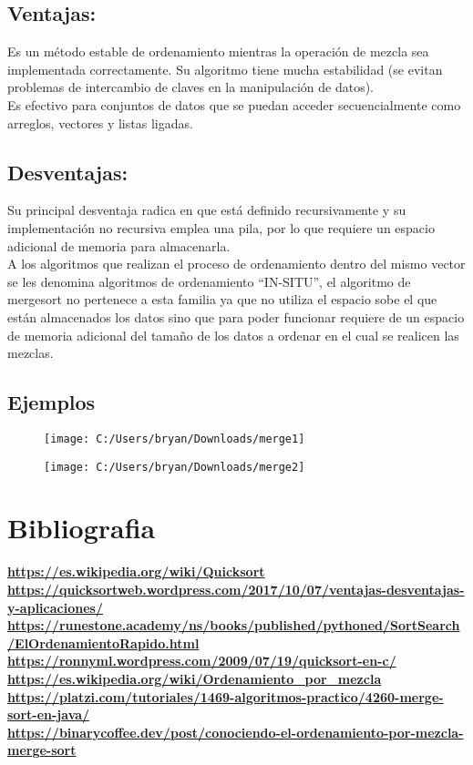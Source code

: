 \documentclass[]{article}
\begin{document}
\subsection{Ventajas:}
Es un método estable de ordenamiento mientras la operación de mezcla sea implementada correctamente.
Su algoritmo tiene mucha estabilidad (se evitan problemas de intercambio de claves en la manipulación de datos).\\
Es efectivo para conjuntos de datos que se puedan acceder secuencialmente como arreglos, vectores y listas ligadas.\\

\subsection{Desventajas:}
Su principal desventaja radica en que está definido recursivamente y su implementación no recursiva emplea una pila, por lo que requiere un espacio adicional de memoria para almacenarla.\\
A los algoritmos que realizan el proceso de ordenamiento dentro del mismo vector se les denomina algoritmos de ordenamiento “IN-SITU”, el algoritmo de mergesort no pertenece a esta familia ya que no utiliza el espacio sobe el que están almacenados los datos sino que para poder funcionar requiere de un espacio de memoria adicional del tamaño de los datos a ordenar en el cual se realicen las mezclas.\\
\newpage
\subsection{Ejemplos}
\begin{figure}[h!]
	\centering
	\texttt{[image: C:/Users/bryan/Downloads/merge1]}
	\caption{}
	\label{fig:merge1}
\end{figure}
\begin{figure}[t!]
	\centering
	\texttt{[image: C:/Users/bryan/Downloads/merge2]}
	\caption{}
	\label{fig:merge2}
\end{figure}
\newpage
\section{Bibliografia}

\underline{\textbf{https://es.wikipedia.org/wiki/Quicksort}}\\
\underline{\textbf{https://quicksortweb.wordpress.com/2017/10/07/ventajas-desventajas-y-aplicaciones/}}\\
\underline{\textbf{https://runestone.academy/ns/books/published/pythoned/SortSearch/ElOrdenamientoRapido.html}}\\
\underline{\textbf{https://ronnyml.wordpress.com/2009/07/19/quicksort-en-c/}}\\
\underline{\textbf{https://es.wikipedia.org/wiki/Ordenamiento\_por\_mezcla}}\\
\underline{\textbf{https://platzi.com/tutoriales/1469-algoritmos-practico/4260-merge-sort-en-java/}}\\
\underline{\textbf{https://binarycoffee.dev/post/conociendo-el-ordenamiento-por-mezcla-merge-sort}}\\
\end{document}
